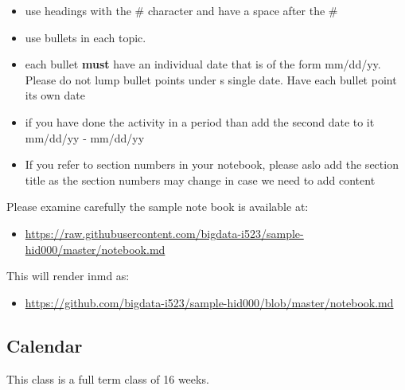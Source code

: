\begin{itemize}
\tightlist
\item
  use headings with the \# character and have a space after the \#
\item
  use bullets in each topic.
\item
  each bullet \textbf{must} have an individual date that is of the form
  mm/dd/yy. Please do not lump bullet points under s single date. Have
  each bullet point its own date
\item
  if you have done the activity in a period than add the second date to
  it mm/dd/yy - mm/dd/yy
\item
  If you refer to section numbers in your notebook, please aslo add the
  section title as the section numbers may change in case we need to add
  content
\end{itemize}

Please examine carefully the sample note book is available at:

\begin{itemize}
\tightlist
\item
  \url{https://raw.githubusercontent.com/bigdata-i523/sample-hid000/master/notebook.md}
\end{itemize}

This will render inmd as:

\begin{itemize}
\tightlist
\item
  \url{https://github.com/bigdata-i523/sample-hid000/blob/master/notebook.md}
\end{itemize}

\subsection{Calendar}\label{calendar}

This class is a full term class of 16 weeks.

